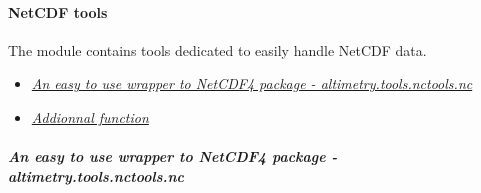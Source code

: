 \documentclass[letterpaper,10pt,english]{sphinxmanual}
\begin{document}
\paragraph{NetCDF tools}
\label{altimetry.tools.nctools:netcdf-tools}\label{altimetry.tools.nctools::doc}
The {\hyperref[altimetry.tools.nctools:module-altimetry.tools.nctools]{}} module contains tools dedicated to easily handle NetCDF data.
\begin{itemize}\setlength{\itemsep}{0pt}\setlength{\parskip}{0pt}
\item {} 
{\hyperref[altimetry.tools.nctools:nc]{\emph{An easy to use wrapper to NetCDF4 package - altimetry.tools.nctools.nc}}}

\item {} 
{\hyperref[altimetry.tools.nctools:load-ncvar]{\emph{Addionnal function}}}

\end{itemize}


\subparagraph{An easy to use wrapper to NetCDF4 package - altimetry.tools.nctools.nc}
\label{altimetry.tools.nctools:nc}\label{altimetry.tools.nctools:an-easy-to-use-wrapper-to-netcdf4-package-altimetry-tools-nctools-nc}
\end{document}

